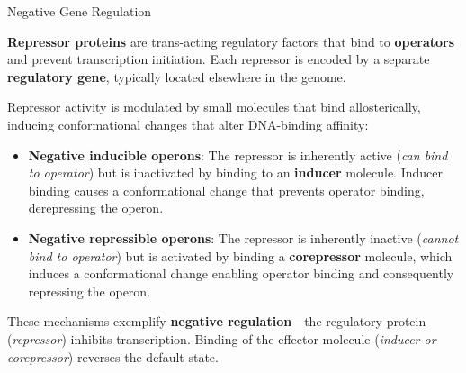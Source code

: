 \documentclass[10pt]{article}
\begin{document}
    \begin{core}[label=core:repressor_operon]{Negative Gene Regulation}
      
      \textbf{Repressor proteins} are trans-acting regulatory factors that bind to \textbf{operators} and prevent transcription initiation. Each repressor is encoded by a separate \textbf{regulatory gene}, typically located elsewhere in the genome.

      Repressor activity is modulated by small molecules that bind allosterically, inducing conformational changes that alter DNA-binding affinity:

      \begin{itemize}

        \item \textbf{Negative inducible operons}: The repressor is inherently active (\textit{can bind to operator}) but is inactivated by binding to an \textbf{inducer} molecule. Inducer binding causes a conformational change that prevents operator binding, derepressing the operon.


        \item \textbf{Negative repressible operons}: The repressor is inherently inactive (\textit{cannot bind to operator}) but is activated by binding a \textbf{corepressor} molecule, which induces a conformational change enabling operator binding and consequently repressing the operon. 


      \end{itemize}
      
      These mechanisms exemplify \textbf{negative regulation}---the regulatory protein (\textit{repressor}) inhibits transcription. Binding of the effector molecule (\textit{inducer or corepressor}) reverses the default state.

    \end{core}
\end{document}
